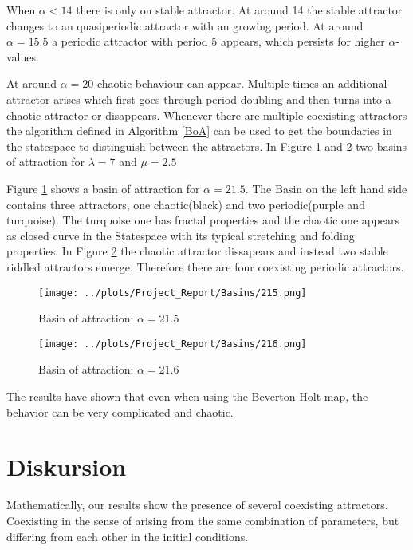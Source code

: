 \documentclass[a4paper,12pt, twoside]{article} %
\begin{document}
When $\alpha < 14$ there is only on stable attractor. At around 14 the stable attractor changes to an quasiperiodic attractor with an growing period.
At around $\alpha = 15.5$ a periodic attractor with period 5 appears, which persists for higher $\alpha$-values.

At around $\alpha = 20$ chaotic behaviour can appear. Multiple times an additional attractor arises which first
 goes through period doubling and then turns into a chaotic attractor or disappears. 
 Whenever there are multiple coexisting attractors the algorithm defined in Algorithm \ref{BoA} can be used to get the boundaries in the statespace to distinguish between the attractors.
 In Figure \ref{fig:basin1} and \ref{fig:basin2} two basins of attraction for $\lambda = 7$ and $\mu = 2.5$

Figure \ref{fig:basin1} shows a basin of attraction for $\alpha = 21.5$. The Basin on the left hand side contains three attractors, one chaotic(black) and two periodic(purple and turquoise).
The turquoise one has fractal properties and the chaotic one appears as closed curve in the Statespace with its typical stretching and folding properties. 
In Figure \ref{fig:basin2} the chaotic attractor dissapears and instead two stable riddled attractors emerge. Therefore there are four coexisting periodic attractors. 

 \begin{landscape}
\begin{figure}[H]
  \begin{centering}
    \texttt{[image: ../plots/Project\_Report/Basins/215.png]}
    \caption{Basin of attraction: $\alpha = 21.5$}
    \label{fig:basin1}
  \end{centering}
\end{figure}


\begin{figure}[H]
  \begin{centering}
    \texttt{[image: ../plots/Project\_Report/Basins/216.png]}
    \caption{Basin of attraction: $\alpha = 21.6$}
    \label{fig:basin2}
  \end{centering}
\end{figure}
\end{landscape}
The results have shown that even when using the Beverton-Holt map, the behavior can be very complicated and chaotic.

\section{Diskursion}
Mathematically, our results show the presence of several coexisting attractors. Coexisting in the sense of arising from the same combination of parameters, but differing from each other in the initial conditions.
\end{document}
